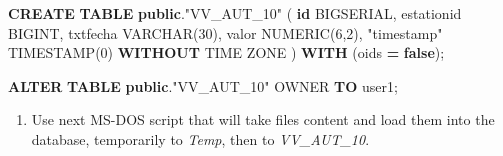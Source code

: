 \documentclass[12pt,oneside]{reedthesis}
\newenvironment{Shaded}{\begin{snugshade}}{\end{snugshade}}
\newcommand{\DataTypeTok}[1]{\textcolor[rgb]{0.13,0.29,0.53}{#1}}
\newcommand{\DecValTok}[1]{\textcolor[rgb]{0.00,0.00,0.81}{#1}}
\newcommand{\KeywordTok}[1]{\textcolor[rgb]{0.13,0.29,0.53}{\textbf{#1}}}
\newcommand{\NormalTok}[1]{#1}
\newcommand{\OperatorTok}[1]{\textcolor[rgb]{0.81,0.36,0.00}{\textbf{#1}}}
\newcommand{\OtherTok}[1]{\textcolor[rgb]{0.56,0.35,0.01}{#1}}
\providecommand{\tightlist}{%
  \setlength{\itemsep}{0pt}\setlength{\parskip}{0pt}}
\begin{document}
\vspace{0.4cm}
\begin{Shaded}
\begin{Highlighting}[]
        \KeywordTok{CREATE} \KeywordTok{TABLE} \KeywordTok{public}\NormalTok{.}\OtherTok{"VV_AUT_10"}\NormalTok{ (}
          \KeywordTok{id}\NormalTok{ BIGSERIAL,}
\NormalTok{          estationid BIGINT,}
\NormalTok{          txtfecha }\DataTypeTok{VARCHAR}\NormalTok{(}\DecValTok{30}\NormalTok{),}
\NormalTok{          valor }\DataTypeTok{NUMERIC}\NormalTok{(}\DecValTok{6}\NormalTok{,}\DecValTok{2}\NormalTok{),}
          \OtherTok{"timestamp"} \DataTypeTok{TIMESTAMP}\NormalTok{(}\DecValTok{0}\NormalTok{) }\KeywordTok{WITHOUT} \DataTypeTok{TIME} \DataTypeTok{ZONE}\NormalTok{ ) }\KeywordTok{WITH}\NormalTok{ (oids }\OperatorTok{=} \KeywordTok{false}\NormalTok{);}
        
        \KeywordTok{ALTER} \KeywordTok{TABLE} \KeywordTok{public}\NormalTok{.}\OtherTok{"VV_AUT_10"}
\NormalTok{          OWNER }\KeywordTok{TO}\NormalTok{ user1;}
\end{Highlighting}
\end{Shaded}
\normalsize
\begin{enumerate}
\def\labelenumi{\arabic{enumi}.}
\setcounter{enumi}{4}
\tightlist
\item
  Use next MS-DOS script that will take files content and load them into the database, temporarily to \emph{Temp}, then to \emph{VV\_AUT\_10}.
\end{enumerate}
\scriptsize
\end{document}
